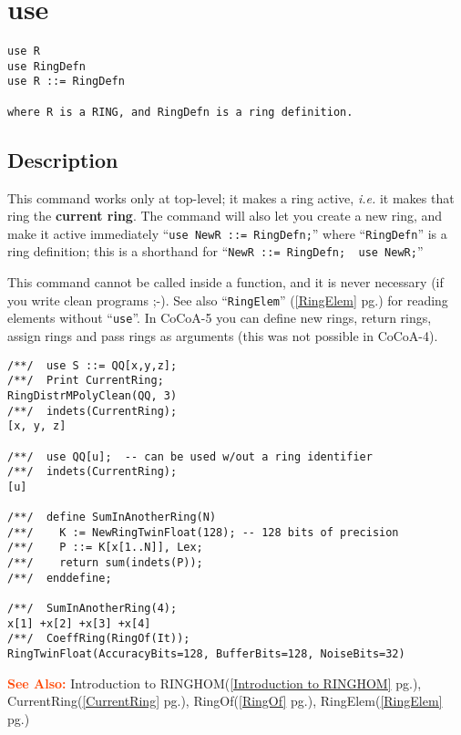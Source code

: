 \documentclass[a4paper]{mybook}
\newenvironment{command}{}{} %
\newcommand\SeeAlso{\par\textcolor{OrangeRed}{\textbf{\large See Also: }}}
\begin{document}
\section{use}
\label{use}
\begin{command} %


\begin{Verbatim}[label=syntax, rulecolor=\color{MidnightBlue},
frame=single]
use R
use RingDefn
use R ::= RingDefn

where R is a RING, and RingDefn is a ring definition.
\end{Verbatim}


\subsection*{Description}

This command works only at top-level; it makes a ring active,
\textit{i.e.} it makes that ring the \textbf{current ring}.
The command will also let you create a new ring, and make it active
immediately ``\verb&use NewR ::= RingDefn;&'' where ``\verb&RingDefn&'' is
a ring definition; this is a shorthand for
``\verb&NewR ::= RingDefn;  use NewR;&''
\par 
This command cannot be called inside a function, and it is never
necessary (if you write clean programs ;-).
See also ``\verb&RingElem&'' (\ref{RingElem} pg.\pageref{RingElem}) for reading elements without ``\verb&use&''.
In CoCoA-5 you can define new rings, return rings, assign rings and
pass rings as arguments (this was not possible in CoCoA-4).
\begin{Verbatim}[label=example, rulecolor=\color{PineGreen}, frame=single]
/**/  use S ::= QQ[x,y,z];
/**/  Print CurrentRing;
RingDistrMPolyClean(QQ, 3)
/**/  indets(CurrentRing);
[x, y, z]

/**/  use QQ[u];  -- can be used w/out a ring identifier
/**/  indets(CurrentRing);
[u]

/**/  define SumInAnotherRing(N)
/**/    K := NewRingTwinFloat(128); -- 128 bits of precision
/**/    P ::= K[x[1..N]], Lex;
/**/    return sum(indets(P));
/**/  enddefine;

/**/  SumInAnotherRing(4);
x[1] +x[2] +x[3] +x[4]
/**/  CoeffRing(RingOf(It));
RingTwinFloat(AccuracyBits=128, BufferBits=128, NoiseBits=32)
\end{Verbatim}


\SeeAlso %
  Introduction to RINGHOM(\ref{Introduction to RINGHOM} pg.\pageref{Introduction to RINGHOM}), 
    CurrentRing(\ref{CurrentRing} pg.\pageref{CurrentRing}), 
    RingOf(\ref{RingOf} pg.\pageref{RingOf}), 
    RingElem(\ref{RingElem} pg.\pageref{RingElem})
\end{command} %
\end{document}
